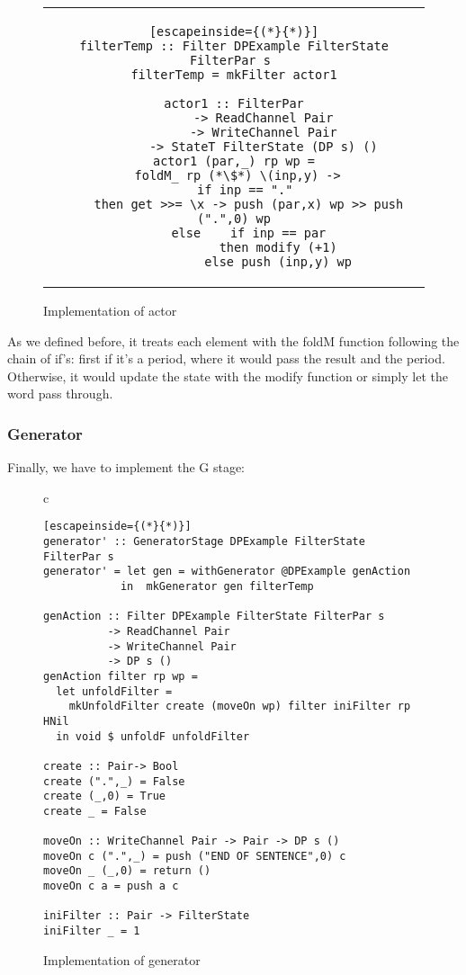 \begin{figure}[H]
    \begin{tabular}{c}
        \begin{lstlisting}[escapeinside={(*}{*)}]
filterTemp :: Filter DPExample FilterState FilterPar s 
filterTemp = mkFilter actor1

actor1 :: FilterPar
        -> ReadChannel Pair
        -> WriteChannel Pair
        -> StateT FilterState (DP s) ()
actor1 (par,_) rp wp =
  foldM_ rp (*\$*) \(inp,y) -> 
    if inp == "." 
    then get >>= \x -> push (par,x) wp >> push (".",0) wp
    else    if inp == par
            then modify (+1)
            else push (inp,y) wp
        \end{lstlisting}
    \end{tabular}
    \caption{Implementation of actor}
    \label{fig:HC19}
\end{figure}

As we defined before, it treats each element with the foldM function following the chain of if's: first if it's a period, where it would pass the result and the period.
Otherwise, it would update the state with the modify function or simply let the word pass through.

\subsubsection*{Generator}
Finally, we have to implement the G stage:

\begin{figure}[H]
    \begin{tabular}{c}
        \begin{lstlisting}[escapeinside={(*}{*)}]
generator' :: GeneratorStage DPExample FilterState FilterPar s
generator' = let gen = withGenerator @DPExample genAction
            in  mkGenerator gen filterTemp

genAction :: Filter DPExample FilterState FilterPar s
          -> ReadChannel Pair
          -> WriteChannel Pair
          -> DP s ()
genAction filter rp wp =
  let unfoldFilter = 
    mkUnfoldFilter create (moveOn wp) filter iniFilter rp HNil
  in void $ unfoldF unfoldFilter

create :: Pair-> Bool
create (".",_) = False
create (_,0) = True
create _ = False

moveOn :: WriteChannel Pair -> Pair -> DP s ()
moveOn c (".",_) = push ("END OF SENTENCE",0) c
moveOn _ (_,0) = return ()
moveOn c a = push a c

iniFilter :: Pair -> FilterState
iniFilter _ = 1
        \end{lstlisting}
    \end{tabular}
    \caption{Implementation of generator}
    \label{fig:HC20}
\end{figure}

